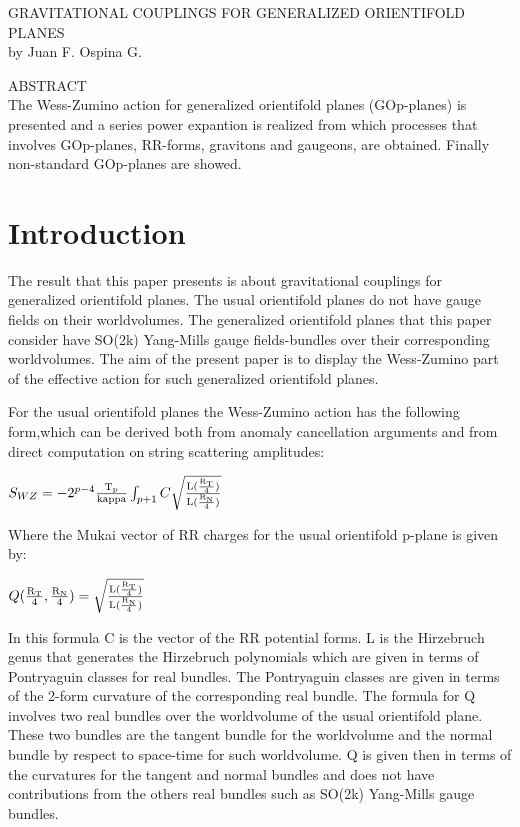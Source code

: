 \documentclass[a4paper,a4paper]{article}
\begin{document}
\begin{center}
GRAVITATIONAL COUPLINGS FOR GENERALIZED ORIENTIFOLD PLANES \\ [.25in]
by Juan F. Ospina G.
\end{center}
\begin{center}
ABSTRACT \\ [.25in]
The Wess-Zumino action for generalized orientifold planes (GOp-planes) is presented and a series power expantion is realized from which processes that involves GOp-planes, RR-forms, gravitons and gaugeons, are obtained. Finally non-standard GOp-planes are showed.
\end{center}

\section{Introduction}
The result that this paper presents is about gravitational couplings for generalized orientifold planes. The usual orientifold planes do not have gauge fields on their worldvolumes. The generalized orientifold planes that this paper consider have SO(2k) Yang-Mills gauge fields-bundles over their corresponding worldvolumes. The aim of the present paper is to display the Wess-Zumino part of the effective action for such generalized orientifold planes.

For the usual orientifold planes the Wess-Zumino action has the following form,which can be derived both from anomaly cancellation arguments and from
direct computation on string scattering amplitudes:   

\begin{center}
{  $ S_{WZ} = -2^{p-4}\frac{\rm T_p}{\rm kappa}\int_{p+1} C\sqrt{\frac{\rm L(\frac{\rm R_T}{\rm 4})}{\rm L(\frac{\rm R_N}{\rm 4})}}$ }
\end{center}

Where the Mukai vector of RR charges for the usual orientifold p-plane is given by:

\begin{center}
{  $ Q(\frac{\rm R_T}{\rm 4},\frac{\rm R_N}{\rm 4}) =\sqrt{\frac{\rm L(\frac{\rm R_T}{\rm 4})}{\rm L(\frac{\rm R_N}{\rm 4})}}  $ }
\end{center}
In this formula C is the vector of the RR potential forms. L is the Hirzebruch genus that generates the Hirzebruch polynomials which are given in
terms of Pontryaguin classes for real bundles. The Pontryaguin classes are given in terms of the 2-form curvature of the corresponding real bundle. The
formula for Q involves two real bundles over the worldvolume of the usual orientifold plane.  These two bundles are the tangent bundle for the worldvolume and the normal bundle by respect to space-time for such worldvolume. Q is given then in terms of the curvatures for the tangent and
normal bundles and does not have contributions  from the others real bundles
such as SO(2k) Yang-Mills gauge bundles.
\end{document}
